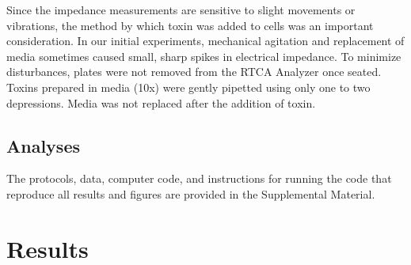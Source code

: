 Since the impedance measurements are sensitive to 
slight movements or vibrations, the method by which 
toxin was added to cells was an important consideration. 
In our initial experiments, mechanical agitation and 
replacement of media sometimes caused small, sharp 
spikes in electrical impedance. To minimize disturbances, 
plates were not removed from the RTCA Analyzer once 
seated. Toxins prepared in media (10x) were gently 
pipetted using only one to two depressions. Media was 
not replaced after the addition of toxin.

\subsection{Analyses}
The protocols, data, computer code, and instructions 
for running the code that reproduce all results and 
figures are provided in the Supplemental Material.


\section{Results}

